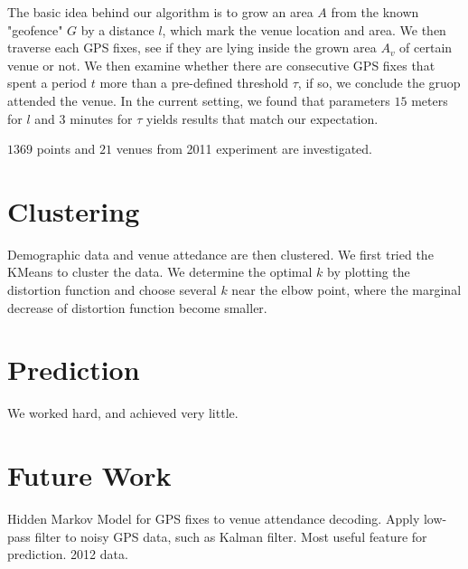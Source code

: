 \documentclass[12pt]{article}
\begin{document}
The basic idea behind our algorithm is to grow an area $A$ from the known "geofence" $G$ by a distance $l$, which mark the venue location and area. We then traverse each GPS fixes, see if they are lying inside the grown area $A_v$ of certain venue or not. We then examine whether there are consecutive GPS fixes that spent a period $t$ more than a pre-defined threshold $\tau$, if so, we conclude the gruop attended the venue. In the current setting, we found that parameters $15$ meters for $l$ and $3$ minutes for $\tau$ yields results that match our expectation.

$1369$ points and $21$ venues from 2011 experiment are investigated.

\section{Clustering}\label{clustering}
Demographic data and venue attedance are then clustered. We first tried the KMeans to cluster the data. We determine the optimal $k$ by plotting the distortion function and choose several $k$ near the elbow point, where the marginal decrease of distortion function become smaller. 

\section{Prediction}\label{prediction}
We worked hard, and achieved very little.

\section{Future Work}\label{future_work}
Hidden Markov Model for GPS fixes to venue attendance decoding. Apply low-pass filter to noisy GPS data, such as Kalman filter. Most useful feature for prediction. 2012 data. 



\end{document}
